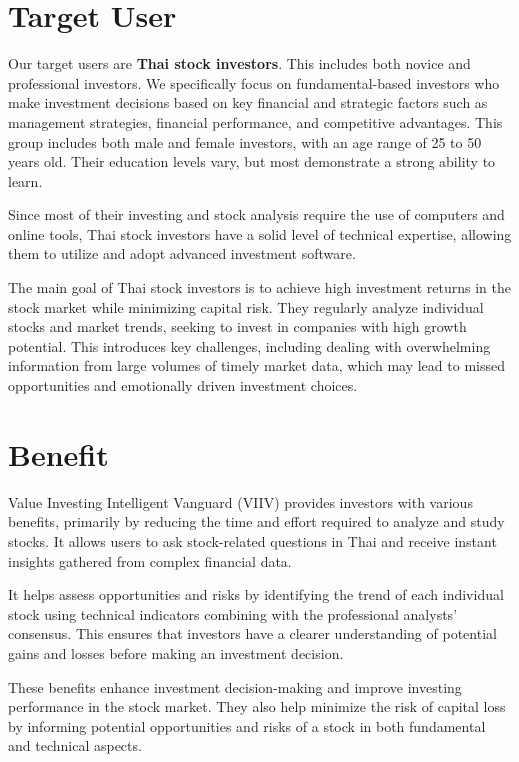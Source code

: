 \section{Target User}
\label{section:target-user}

Our target users are \textbf{Thai stock investors}. This includes both novice and professional investors.
We specifically focus on fundamental-based investors who make investment decisions based on key financial 
and strategic factors such as management strategies, financial performance, and competitive advantages.
This group includes both male and female investors, with an age range of 25 to 50 years old.
Their education levels vary, but most demonstrate a strong ability to learn.

Since most of their investing and stock analysis require the use of computers and online tools,
Thai stock investors have a solid level of technical expertise, allowing them to utilize and adopt advanced investment software.

The main goal of Thai stock investors is to achieve high investment returns in the stock market while minimizing capital risk.
They regularly analyze individual stocks and market trends, seeking to invest in companies with high growth potential.
This introduces key challenges, including dealing with overwhelming information from large volumes of timely market data,
which may lead to missed opportunities and emotionally driven investment choices.

\section{Benefit}
\label{section:benefit}

Value Investing Intelligent Vanguard (VIIV) provides investors with various benefits, primarily by reducing the time and effort
required to analyze and study stocks. It allows users to ask stock-related questions in Thai and receive instant insights gathered
from complex financial data.

It helps assess opportunities and risks by identifying the trend of each individual stock using technical indicators
combining with the professional analysts' consensus. This ensures that investors have a clearer understanding of potential gains and
losses before making an investment decision.

These benefits enhance investment decision-making and improve investing performance in the stock market. They also help minimize the
risk of capital loss by informing potential opportunities and risks of a stock in both fundamental and technical aspects.

